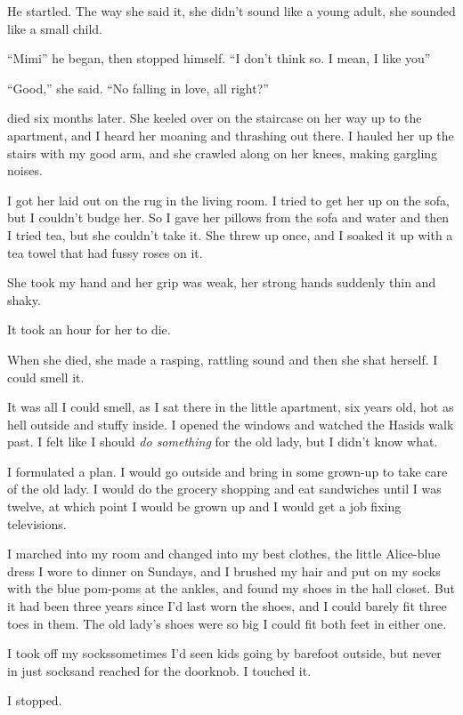 He startled.  The way she said it, she didn't sound like a young
adult, she sounded like a small child.

``Mimi\dash{}'' he began, then stopped himself.  ``I don't think so.  I
mean, I like you\dash{}''

``Good,'' she said.  ``No falling in love, all right?''

 died six months later.  She keeled over on the staircase on her
way up to the apartment, and I heard her moaning and thrashing out
there.  I hauled her up the stairs with my good arm, and she crawled
along on her knees, making gargling noises.

I got her laid out on the rug in the living room.  I tried to get her
up on the sofa, but I couldn't budge her.  So I gave her pillows from
the sofa and water and then I tried tea, but she couldn't take it. 
She threw up once, and I soaked it up with a tea towel that had fussy
roses on it.

She took my hand and her grip was weak, her strong hands suddenly thin
and shaky.

It took an hour for her to die.

When she died, she made a rasping, rattling sound and then she shat
herself.  I could smell it.

It was all I could smell, as I sat there in the little apartment, six
years old, hot as hell outside and stuffy inside.  I opened the
windows and watched the Hasids walk past.  I felt like I should
\textit{do something} for the old lady, but I didn't know what.

I formulated a plan.  I would go outside and bring in some grown-up to
take care of the old lady.  I would do the grocery shopping and eat
sandwiches until I was twelve, at which point I would be grown up and
I would get a job fixing televisions.

I marched into my room and changed into my best clothes, the little
Alice-blue dress I wore to dinner on Sundays, and I brushed my hair
and put on my socks with the blue pom-poms at the ankles, and found my
shoes in the hall closet.  But it had been three years since I'd last
worn the shoes, and I could barely fit three toes in them.  The old
lady's shoes were so big I could fit both feet in either one.

I took off my socks\dash{}sometimes I'd seen kids going by barefoot
outside, but never in just socks\dash{}and reached for the doorknob.  I
touched it.

I stopped.

